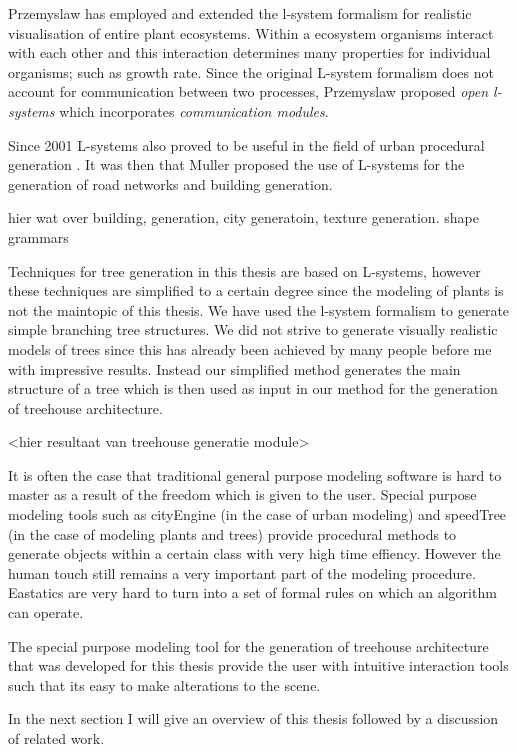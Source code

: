 \documentclass{article}
\begin{document}
Przemyslaw \cite{PrzemyslawPlants} has employed and extended the l-system formalism for realistic visualisation of
entire plant ecosystems. Within a ecosystem organisms interact with each other and this interaction determines many 
properties for individual organisms; such as growth rate. Since the original L-system formalism does not account for communication between two processes, Przemyslaw proposed \emph{open l-systems} which incorporates \emph{communication modules}.    
  
Since 2001 L-systems also proved to be useful in the field of urban procedural generation \cite{Wonka03}. It was then that Muller proposed the use of L-systems for the generation of road networks and building generation. 

hier wat over building, generation, city generatoin, texture generation.
shape grammars

Techniques for tree generation in this thesis are based on L-systems, however these techniques are simplified to a certain degree since the modeling of plants is not the maintopic of this thesis. We have used the l-system formalism to generate simple branching tree structures. We did not strive to generate visually realistic models of trees since this has already been achieved by many people before me with impressive results. Instead our simplified method generates the main structure of a tree which is then used as input in our method for the generation of treehouse architecture. 

<hier resultaat van treehouse generatie module>

It is often the case that traditional general purpose modeling software is hard to master as a result of the freedom which is given to the user. Special purpose modeling tools such as cityEngine \cite{Muller06} (in the case of urban modeling) and speedTree (in the case of modeling plants and trees) provide procedural methods to generate objects within a certain class with very high time effiency. However the human touch still remains a very important part of the modeling procedure. Eastatics are very hard to turn into a set of formal rules on which an algorithm can operate.

The special purpose modeling tool for the generation of treehouse architecture that was developed for this thesis provide the user with intuitive interaction tools such that its easy to make alterations to the scene.       

In the next section I will give an overview of this thesis followed by a discussion of related work. 
\end{document}

